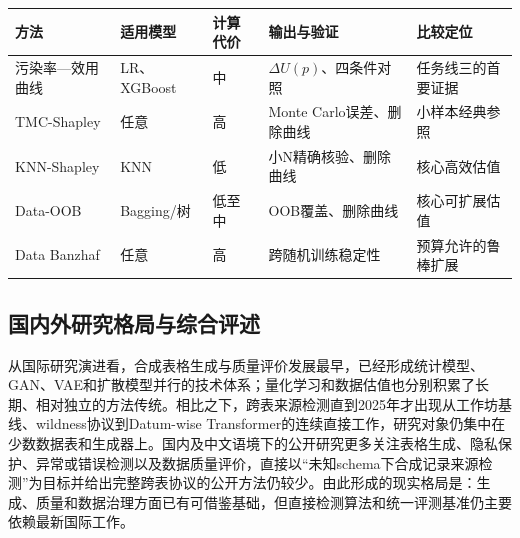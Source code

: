 \documentclass[
  chinese,
  12pt,
  a4paper,
  chinese,
  UTF8]{ctexart}
\begin{document}
\begin{longtable}[]{@{}
  >{\raggedright\arraybackslash}p{}
  >{\raggedright\arraybackslash}p{}
  >{\raggedleft\arraybackslash}p{}
  >{\raggedright\arraybackslash}p{}
  >{\raggedright\arraybackslash}p{}@{}}
\toprule\noalign{}
\begin{minipage}[b]{\linewidth}\raggedright
方法
\end{minipage} & \begin{minipage}[b]{\linewidth}\raggedright
适用模型
\end{minipage} & \begin{minipage}[b]{\linewidth}\raggedleft
计算代价
\end{minipage} & \begin{minipage}[b]{\linewidth}\raggedright
输出与验证
\end{minipage} & \begin{minipage}[b]{\linewidth}\raggedright
比较定位
\end{minipage} \\
\midrule\noalign{}
\endhead
\bottomrule\noalign{}
\endlastfoot
污染率---效用曲线 & LR、XGBoost & 中 & \(\Delta U(p)\)、四条件对照 &
任务线三的首要证据 \\
TMC-Shapley & 任意 & 高 & Monte Carlo误差、删除曲线 & 小样本经典参照 \\
KNN-Shapley & KNN & 低 & 小N精确核验、删除曲线 & 核心高效估值 \\
Data-OOB & Bagging/树 & 低至中 & OOB覆盖、删除曲线 & 核心可扩展估值 \\
Data Banzhaf & 任意 & 高 & 跨随机训练稳定性 & 预算允许的鲁棒扩展 \\
\end{longtable}

\subsection{国内外研究格局与综合评述}\label{ux56fdux5185ux5916ux7814ux7a76ux683cux5c40ux4e0eux7efcux5408ux8bc4ux8ff0}

从国际研究演进看，合成表格生成与质量评价发展最早，已经形成统计模型、GAN、VAE和扩散模型并行的技术体系；量化学习和数据估值也分别积累了长期、相对独立的方法传统。相比之下，跨表来源检测直到2025年才出现从工作坊基线、wildness协议到Datum-wise
Transformer的连续直接工作，研究对象仍集中在少数数据表和生成器上。国内及中文语境下的公开研究更多关注表格生成、隐私保护、异常或错误检测以及数据质量评价，直接以``未知schema下合成记录来源检测''为目标并给出完整跨表协议的公开方法仍较少。由此形成的现实格局是：生成、质量和数据治理方面已有可借鉴基础，但直接检测算法和统一评测基准仍主要依赖最新国际工作。
\end{document}
